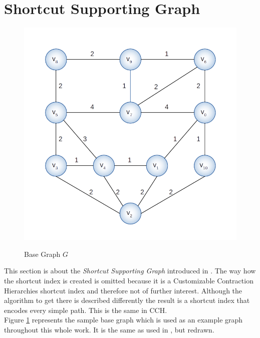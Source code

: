 \documentclass[twocolumn]{article}
\begin{document}
\section{Shortcut Supporting Graph}

\begin{figure}[h]
    \caption{Base Graph $G$}
    \centering
    \includegraphics[width=\linewidth]{baseGraph}
    \label{fig:baseGraph}
\end{figure}

This section is about the \textit{Shortcut Supporting Graph} introduced in \cite{Ouyang2020}.
The way how the shortcut index is created is omitted because it is a Customizable Contraction
Hierarchies shortcut index and therefore not of further interest. Although the algorithm to get
there is described differently the result is a shortcut index that encodes every simple path.
This is the same in CCH.
\\
Figure \ref{fig:baseGraph} represents the sample base graph which is used as an example graph 
throughout this whole work. It is the same as used in \cite{Ouyang2020}, but redrawn.
\end{document}
